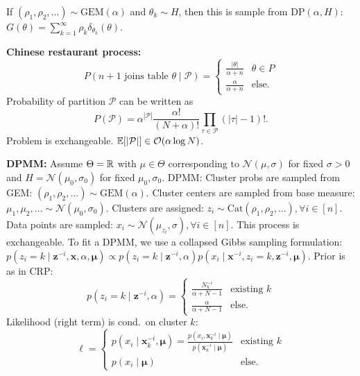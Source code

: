 \documentclass[9pt]{extarticle}
\newenvironment{topic}[1]
{\textbf{\sffamily \colorbox{black}{\rlap{\textbf{\textcolor{white}{#1}}}\hspace{\linewidth}\hspace{-2\fboxsep}}}}
{}
\newenvironment{subtopic}[1]
{\textbf{\sffamily #1:}}
{}
\renewcommand{\vec}[1]{\ensuremath{\mathbold{#1}}}
\begin{document}
\begin{multicols*}{3}
\begin{topic}{Non-parametric Bayesian methods}
        If $(\rho_1, \rho_2, \ldots) \sim \mathrm{GEM}(\alpha)$ and $\theta_k \sim H$, then this is sample
        from $\mathrm{DP}(\alpha, H)$: $G(\theta) = \sum_{k=1}^{\infty} \rho_k \delta_{\theta_k}(\theta)$.

        \begin{subtopic}{Chinese restaurant process}
            \[
                P(\text{$n+1$ joins table $\theta$} \mid \mathcal{P}) = \begin{cases}
                    \frac{|\theta|}{\alpha+n} & \theta \in P \\
                    \frac{\alpha}{\alpha+n}   & \text{else}.
                \end{cases}
            \]
            Probability of partition $\mathcal{P}$ can be written as \[
                P(\mathcal{P}) = \alpha^{|\mathcal{P}|} \frac{\alpha!}{(N+\alpha)!} \prod_{\tau \in \mathcal{P}} (|\tau| -1)!.
            \]
            Problem is exchangeable. $\E[|\mathcal{P}|] \in \bigo{\alpha \log N}$.

        \end{subtopic}

        \begin{subtopic}{DPMM}
            Assume $\Theta = \mathbb{R}$ with $\mu \in \Theta$ corresponding to $\mathcal{N}(\mu, \sigma)$ for fixed
            $\sigma > 0$ and $H = \mathcal{N}(\mu_0, \sigma_0)$ for fixed $\mu_0,\sigma_0$. DPMM: Cluster probs
            are sampled from GEM: $(\rho_1, \rho_2, \ldots) \sim \mathrm{GEM}(\alpha)$. Cluster centers are
            sampled from base measure: $\mu_1, \mu_2, \ldots \sim \mathcal{N}(\mu_0, \sigma_0)$. Clusters are
            assigned: $z_i \sim \mathrm{Cat}(\rho_1, \rho_2, \ldots), \forall i \in [n]$. Data points are
            sampled: $x_i \sim \mathcal{N}(\mu_{z_i}, \sigma), \forall i \in [n]$. This process is
            exchangeable. To fit a DPMM, we use a collapsed Gibbs sampling formulation: $p(z_i = k \mid
                \vec{z}^{-i}, \vec{x}, \alpha, \vec{\mu}) \propto p(z_i = k \mid \vec{z}^{-i}, \alpha) p(x_i \mid
                \vec{x}^{-i}, z_i=k, \vec{z}^{-i}, \vec{\mu})$. Prior is as in CRP: \[
                p(z_i = k \mid \vec{z}^{-i}, \alpha) = \begin{cases}
                    \frac{N_k^{-i}}{\alpha+N-1} & \text{existing $k$} \\
                    \frac{\alpha}{\alpha+N-1}   & \text{else}.
                \end{cases}
            \]
            Likelihood (right term) is cond.\ on cluster $k$: \[
                \ell = \begin{cases}
                    p(x_i \mid \vec{x}_k^{-i}, \vec{\mu}) = \frac{p(x_i, \vec{x}_k^{-i} \mid \vec{\mu})}{p(\vec{x}_k^{-i} \mid \vec{\mu})} & \text{existing $k$} \\
                    p(x_i \mid \vec{\mu})                                                                                                  & \text{else}.
                \end{cases}
            \]


\end{subtopic}
\end{topic}
\end{multicols*}
\end{document}
